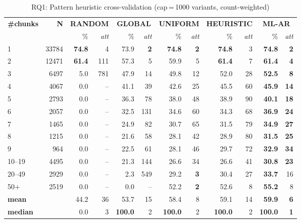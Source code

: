 \begin{table}[ht]
\centering
\caption{RQ1: Pattern heuristic cross-validation (cap\,=\,1000 variants, count-weighted)}
\label{tab:rq1}
\begin{tabular}{lr|rr|rr|rr|rr|rr}
\hline
\textbf{\#chunks} & \textbf{N} & \multicolumn{2}{c|}{\textbf{RANDOM}} & \multicolumn{2}{c|}{\textbf{GLOBAL}} & \multicolumn{2}{c|}{\textbf{UNIFORM}} & \multicolumn{2}{c|}{\textbf{HEURISTIC}} & \multicolumn{2}{c}{\textbf{ML-AR}} \\
 &  & \% & \textit{att} & \% & \textit{att} & \% & \textit{att} & \% & \textit{att} & \% & \textit{att} \\
\hline
1 & 33784 & \textbf{74.8} & 4 & 73.9 & \textbf{2} & \textbf{74.8} & \textbf{2} & \textbf{74.8} & 3 & \textbf{74.8} & \textbf{2} \\
2 & 12471 & \textbf{61.4} & 111 & 57.3 & 5 & 59.9 & 5 & \textbf{61.4} & 7 & \textbf{61.4} & \textbf{4} \\
3 & 6497 & 5.0 & 781 & 47.9 & 14 & 49.8 & 12 & 52.0 & 28 & \textbf{52.5} & \textbf{8} \\
4 & 4067 & 0.0 & -- & 41.1 & 39 & 42.6 & 25 & 45.5 & 60 & \textbf{45.9} & \textbf{14} \\
5 & 2793 & 0.0 & -- & 36.3 & 78 & 38.0 & 48 & 38.9 & 90 & \textbf{40.1} & \textbf{18} \\
6 & 2057 & 0.0 & -- & 32.5 & 131 & 34.6 & 60 & 34.3 & 68 & \textbf{36.9} & \textbf{24} \\
7 & 1465 & 0.0 & -- & 24.9 & 82 & 30.7 & 65 & 31.5 & 79 & \textbf{34.9} & \textbf{27} \\
8 & 1215 & 0.0 & -- & 21.6 & 58 & 28.1 & 42 & 28.9 & 80 & \textbf{31.5} & \textbf{25} \\
9 & 964 & 0.0 & -- & 22.5 & 61 & 28.1 & 46 & 29.7 & 72 & \textbf{32.9} & \textbf{34} \\
10--19 & 4495 & 0.0 & -- & 21.3 & 144 & 26.6 & 34 & 26.6 & 41 & \textbf{30.8} & \textbf{23} \\
20--49 & 2929 & 0.0 & -- & 2.3 & 549 & 29.2 & \textbf{3} & 30.4 & 27 & \textbf{33.7} & 16 \\
50+ & 2519 & 0.0 & -- & 0.0 & -- & 52.2 & \textbf{2} & 52.6 & 8 & \textbf{55.2} & 8 \\
\hline
\textbf{mean} &  & 44.2 & 36 & 53.7 & 15 & 58.4 & 8 & 59.1 & 14 & \textbf{59.9} & \textbf{6} \\
\textbf{median} &  & 0.0 & 3 & \textbf{100.0} & 2 & \textbf{100.0} & 2 & \textbf{100.0} & 2 & \textbf{100.0} & \textbf{1} \\
\hline
\end{tabular}
\end{table}
